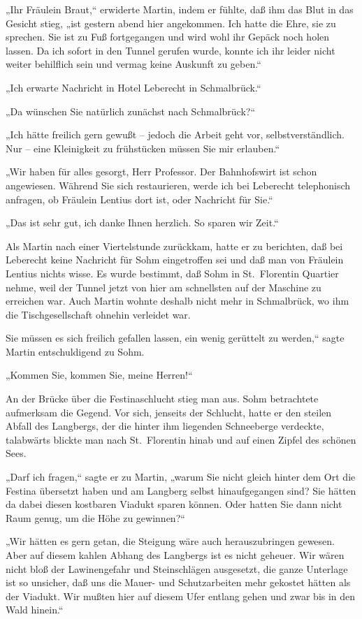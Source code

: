 „Ihr Fräulein Braut,“ erwiderte Martin, indem er fühlte, daß ihm
das Blut in das Gesicht stieg, „ist gestern abend hier angekommen.
Ich hatte die Ehre, sie zu sprechen. Sie ist zu Fuß fortgegangen
und wird wohl ihr Gepäck noch holen lassen. Da ich sofort in den
Tunnel gerufen wurde, konnte ich ihr leider nicht weiter behilflich
sein und vermag keine Auskunft zu geben.“

„Ich erwarte Nachricht in Hotel Leberecht in Schmalbrück.“

„Da wünschen Sie natürlich zunächst nach Schmalbrück?“

„Ich hätte freilich gern gewußt – jedoch die Arbeit geht vor,
selbstverständlich. Nur – eine Kleinigkeit zu frühstücken müssen
Sie mir erlauben.“

„Wir haben für alles gesorgt, Herr Professor. Der Bahnhofswirt ist
schon angewiesen. Während Sie sich restaurieren, werde ich bei
Leberecht telephonisch anfragen, ob Fräulein Lentius dort ist, oder
Nachricht für Sie.“

„Das ist sehr gut, ich danke Ihnen herzlich. So sparen wir Zeit.“

Als Martin nach einer Viertelstunde zurückkam, hatte er zu
berichten, daß bei Leberecht keine Nachricht für Sohm eingetroffen
sei und daß man von Fräulein Lentius nichts wisse. Es wurde
bestimmt, daß Sohm in St.~Florentin Quartier nehme, weil der Tunnel
jetzt von hier am schnellsten auf der Maschine zu erreichen war.
Auch Martin wohnte deshalb nicht mehr in Schmalbrück, wo ihm die
Tischgesellschaft ohnehin verleidet war.

Sie müssen es sich freilich gefallen lassen, ein wenig gerüttelt zu
werden,“ sagte Martin entschuldigend zu Sohm.

„Kommen Sie, kommen Sie, meine Herren!“

An der Brücke über die Festinaschlucht stieg man aus. Sohm
betrachtete aufmerksam die Gegend. Vor sich, jenseits der Schlucht,
hatte er den steilen Abfall des Langbergs, der die hinter ihm
liegenden Schneeberge verdeckte, talabwärts blickte man nach
St.~Florentin hinab und auf einen Zipfel des schönen Sees.

„Darf ich fragen,“ sagte er zu Martin, „warum Sie nicht gleich
hinter dem Ort die Festina übersetzt haben und am Langberg selbst
hinaufgegangen sind? Sie hätten da dabei diesen kostbaren Viadukt
sparen können. Oder hatten Sie dann nicht Raum genug, um die Höhe
zu gewinnen?“

„Wir hätten es gern getan, die Steigung wäre auch herauszubringen
gewesen. Aber auf diesem kahlen Abhang des Langbergs ist es nicht
geheuer. Wir wären nicht bloß der Lawinengefahr und Steinschlägen
ausgesetzt, die ganze Unterlage ist so unsicher, daß uns die Mauer-
und Schutzarbeiten mehr gekostet hätten als der Viadukt. Wir mußten
hier auf diesem Ufer entlang gehen und zwar bis in den Wald
hinein.“

